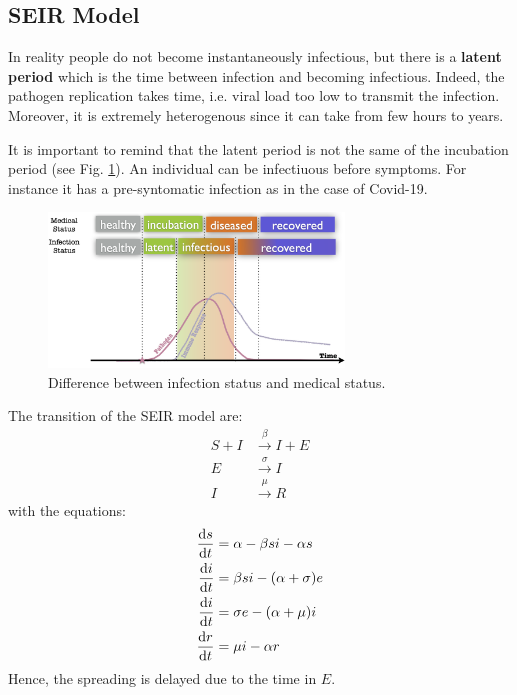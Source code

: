 \documentclass[../main/main.tex]{subfiles}
\begin{document}
\subsection{SEIR Model}

In reality people do not become instantaneously infectious, but there is a \textbf{latent period} which is the time between infection and becoming infectious. Indeed, the pathogen replication takes time, i.e. viral load too low to transmit the infection.
Moreover, it is extremely heterogenous since it can take from few hours to years.

It is important to remind that the latent period is not the same of the incubation period (see Fig. \ref{fig:05_1}). An individual can be infectiuous before symptoms. For instance it has a pre-syntomatic infection as in the case of Covid-19.

\begin{figure}[h!]
\centering
\includegraphics[width=0.7\textwidth]{../lessons/image/05/1.png}
\caption{\label{fig:05_1} Difference between infection status and medical status.}
\end{figure}

The transition of the SEIR model are:
\begin{equation}
\begin{split}
 S + I &\overset{\beta }{\rightarrow } I + E   \\
 E & \overset{\sigma }{\rightarrow } I  \\
 I & \overset{\mu }{\rightarrow } R
\end{split}
\end{equation}
with the equations:
\begin{equation}
  \begin{split}
    \dv{s}{t} &= \alpha -\beta s i - \alpha s \\
  \dv{i}{t} &= \beta s i - (\alpha + \sigma )e \\
  \dv{i}{t} &= \sigma e - (\alpha + \mu )i \\
  \dv{r}{t} &= \mu i - \alpha r
\end{split}
\end{equation}
Hence, the spreading is delayed due to the time in \( E \).
\end{document}
